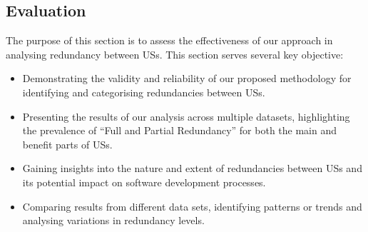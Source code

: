 \subsection{Evaluation}\label{redundancy_evaluation}

The purpose of this section is to assess the effectiveness of our approach in analysing redundancy between USs. This section serves several key objective:
\begin{itemize}
	
	\item Demonstrating the validity and reliability of our proposed methodology for identifying and categorising redundancies between USs.
	
	\item Presenting the results of our analysis across multiple datasets, highlighting the prevalence of \enquote{Full and Partial Redundancy} for both the main and benefit parts of USs.
	
	\item Gaining insights into the nature and extent of redundancies between USs and its potential impact on software development processes.
	
	\item Comparing results from different data sets, identifying patterns or trends and analysing variations in redundancy levels.
	
\end{itemize}

